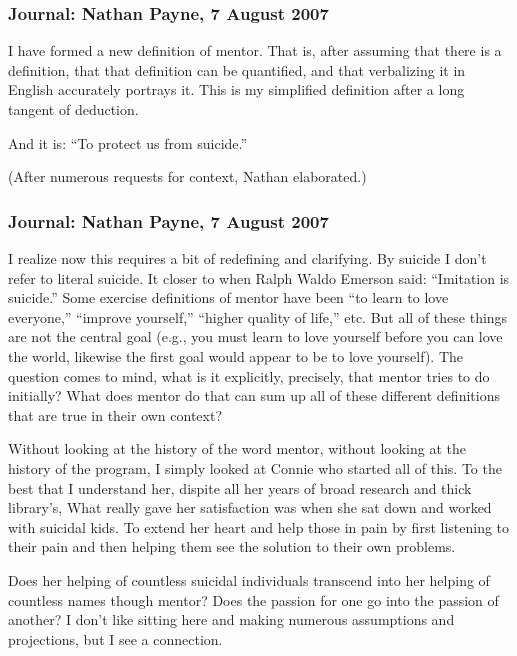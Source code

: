 \subsubsection{Journal: Nathan Payne, 7 August 2007}

I have formed a new definition of mentor. That is, after assuming that there is a definition, that that definition can be quantified, and that verbalizing it in English accurately portrays it. This is my simplified definition after a long tangent of deduction. 

And it is: ``To protect us from suicide.''

\bigskip

(After numerous requests for context, Nathan elaborated.)

\subsubsection{Journal: Nathan Payne, 7 August 2007}

I realize now this requires a bit of redefining and clarifying. By suicide I don't refer to literal suicide. It closer to when Ralph Waldo Emerson said: ``Imitation is suicide.'' Some exercise definitions of mentor have been ``to learn to love everyone,'' ``improve yourself,'' ``higher quality of life,'' etc. But all of these things are not the central goal (e.g., you must learn to love yourself before you can love the world, likewise the first goal would appear to be to love yourself). The question comes to mind, what is it explicitly, precisely, that mentor tries to do initially? What does mentor do that can sum up all of these different definitions that are true in their own context?
 
Without looking at the history of the word mentor, without looking at the history of the program, I simply looked at Connie who started all of this. To the best that I understand her, dispite all her years of broad research and thick library's, What really gave her satisfaction was when she sat down and worked with suicidal kids. To extend her heart and help those in pain by first listening to their pain and then helping them see the solution to their own problems.
 
Does her helping of countless suicidal individuals transcend into her helping of countless names though mentor? Does the passion for one go into the passion of another? I don't like sitting here and making numerous assumptions and projections, but I see a connection.
 
